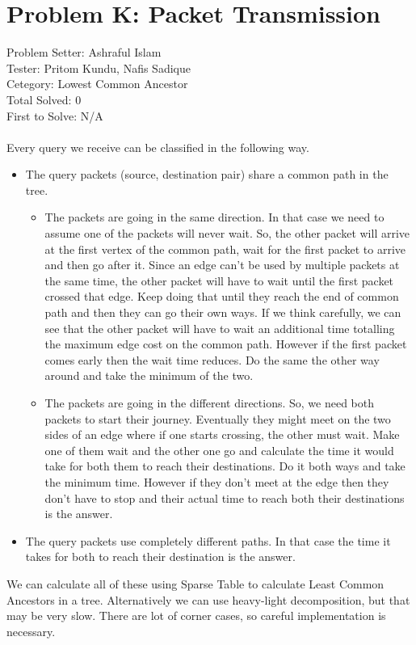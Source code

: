 \section*{Problem K: Packet Transmission}
Problem Setter: Ashraful Islam \\
Tester: Pritom Kundu, Nafis Sadique \\
Cetegory: Lowest Common Ancestor \\
Total Solved: 0 \\
First to Solve: N/A \\
\\
Every query we receive can be classified in the following way.
\begin{itemize}[label=\scalebox{1.0}{$\bullet$}]
    \item The query packets (source, destination pair) share a common path in the tree. 
    \begin{itemize}[label=\scalebox{0.5}{$\blacksquare$}]
        \item The packets are going in the same direction. In that case we need to assume one of the
        packets will never wait. So, the other packet will arrive at the first vertex of the common path,
        wait for the first packet to arrive and then go after it. Since an edge can't be used by
        multiple packets at the same time, the other packet will have to wait until the first packet 
        crossed that edge. Keep doing that until they reach the end of common path and then they can 
        go their own ways. If we think carefully, we can see that the other packet will have to wait
        an additional time totalling the maximum edge cost on the common path. However if the first
        packet comes early then the wait time reduces. Do the same the other way around and take
        the minimum of the two.
        \item The packets are going in the different directions. So, we need both packets to start
        their journey. Eventually they might meet on the two sides of an edge where if one starts crossing,
        the other must wait. Make one of them wait and the other one go and calculate the time it would 
        take for both them to reach their destinations. Do it both ways and take the minimum time. However if
        they don't meet at the edge then they don't have to stop and their actual time to reach both 
        their destinations is the answer. 
    \end{itemize}
    \item The query packets use completely different paths. In that case the time it takes for both to reach
    their destination is the answer.
\end{itemize}
We can calculate all of these using Sparse Table to calculate Least Common Ancestors in a tree. Alternatively 
we can use heavy-light decomposition, but that may be very slow. There are lot of corner cases, so careful 
implementation is necessary.
